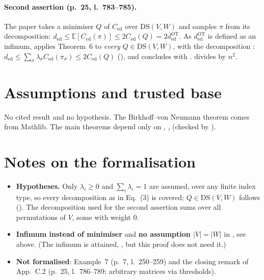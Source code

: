 \paragraph{Second assertion (p.~25, l.~783--785).} The paper takes a minimiser $Q$ of $C_{\mathrm{ed}}$ over
$\mathrm{DS}(V,W)$ and samples $\pi$ from its decomposition: $d_{\mathrm{ed}}\le\mathbb E[C_{\mathrm{ed}}(\pi)]\le
2C_{\mathrm{ed}}(Q)=2d^{\mathrm{OT}}_{\mathrm{ed}}$. As $d^{\mathrm{OT}}_{\mathrm{ed}}$ is defined as an infimum,
 applies Theorem~6 to \emph{every} $Q\in\mathrm{DS}(V,W)$, with the decomposition
: $d_{\mathrm{ed}}\le\sum_\sigma\lambda_\sigma C_{\mathrm{ed}}(\pi_\sigma)\le
2C_{\mathrm{ed}}(Q)$ (), and concludes with .  divides by
$n^2$.

\section{Assumptions and trusted base}
No cited result and no hypothesis. The Birkhoff--von Neumann theorem comes from Mathlib. The main theorems
depend only on , ,  (checked by
).

\section{Notes on the formalisation}
\begin{itemize}
\item \textbf{Hypotheses.} Only $\lambda_i\ge0$ and $\sum_i\lambda_i=1$ are assumed, over any finite index type, so
  every decomposition as in Eq.~(3) is covered; $Q\in\mathrm{DS}(V,W)$ follows ().
  The decomposition  used for the second assertion sums over all
  permutations of $V$, some with weight $0$.
\item \textbf{Infimum instead of minimiser} and \textbf{no assumption $|V|=|W|$} in ,
  see above. (The infimum is attained, , but this proof does not need it.)
\item \textbf{Not formalised}: Example~7 (p.~7, l.~250--259) and the closing remark of App.~C.2 (p.~25,
  l.~786--789; arbitrary matrices via thresholds).
\end{itemize}

